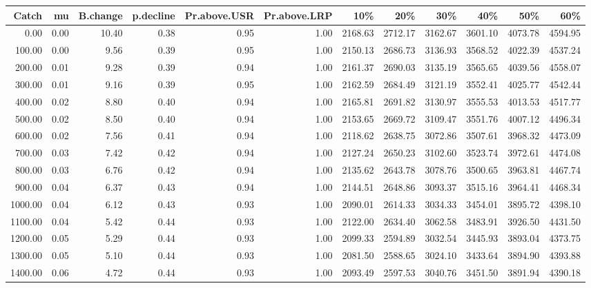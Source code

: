 \begin{table}[ht]
\centering
\begin{tabular}{rrrrrrrrrrrr}
  \hline
Catch & mu & B.change & p.decline & Pr.above.USR & Pr.above.LRP & 10\% & 20\% & 30\% & 40\% & 50\% & 60\% \\ 
  \hline
0.00 & 0.00 & 10.40 & 0.38 & 0.95 & 1.00 & 2168.63 & 2712.17 & 3162.67 & 3601.10 & 4073.78 & 4594.95 \\ 
  100.00 & 0.00 & 9.56 & 0.39 & 0.95 & 1.00 & 2150.13 & 2686.73 & 3136.93 & 3568.52 & 4022.39 & 4537.24 \\ 
  200.00 & 0.01 & 9.28 & 0.39 & 0.94 & 1.00 & 2161.37 & 2690.03 & 3135.19 & 3565.65 & 4039.56 & 4558.07 \\ 
  300.00 & 0.01 & 9.16 & 0.39 & 0.95 & 1.00 & 2162.59 & 2684.49 & 3121.19 & 3552.41 & 4025.77 & 4542.44 \\ 
  400.00 & 0.02 & 8.80 & 0.40 & 0.94 & 1.00 & 2165.81 & 2691.82 & 3130.97 & 3555.53 & 4013.53 & 4517.77 \\ 
  500.00 & 0.02 & 8.50 & 0.40 & 0.94 & 1.00 & 2153.65 & 2669.72 & 3109.47 & 3551.76 & 4007.12 & 4496.34 \\ 
  600.00 & 0.02 & 7.56 & 0.41 & 0.94 & 1.00 & 2118.62 & 2638.75 & 3072.86 & 3507.61 & 3968.32 & 4473.09 \\ 
  700.00 & 0.03 & 7.42 & 0.42 & 0.94 & 1.00 & 2127.24 & 2650.23 & 3102.60 & 3523.74 & 3972.61 & 4474.08 \\ 
  800.00 & 0.03 & 6.76 & 0.42 & 0.94 & 1.00 & 2135.62 & 2643.78 & 3078.76 & 3500.65 & 3963.81 & 4467.74 \\ 
  900.00 & 0.04 & 6.37 & 0.43 & 0.94 & 1.00 & 2144.51 & 2648.86 & 3093.37 & 3515.16 & 3964.41 & 4468.34 \\ 
  1000.00 & 0.04 & 6.12 & 0.43 & 0.93 & 1.00 & 2090.01 & 2614.33 & 3034.33 & 3454.01 & 3895.72 & 4398.10 \\ 
  1100.00 & 0.04 & 5.42 & 0.44 & 0.93 & 1.00 & 2122.00 & 2634.40 & 3062.58 & 3483.91 & 3926.50 & 4431.50 \\ 
  1200.00 & 0.05 & 5.29 & 0.44 & 0.93 & 1.00 & 2099.33 & 2594.89 & 3032.54 & 3445.93 & 3893.04 & 4373.75 \\ 
  1300.00 & 0.05 & 5.10 & 0.44 & 0.93 & 1.00 & 2081.50 & 2588.65 & 3024.10 & 3433.64 & 3894.90 & 4393.88 \\ 
  1400.00 & 0.06 & 4.72 & 0.44 & 0.93 & 1.00 & 2093.49 & 2597.53 & 3040.76 & 3451.50 & 3891.94 & 4390.18 \\ 

\end{tabular}
\end{table}
